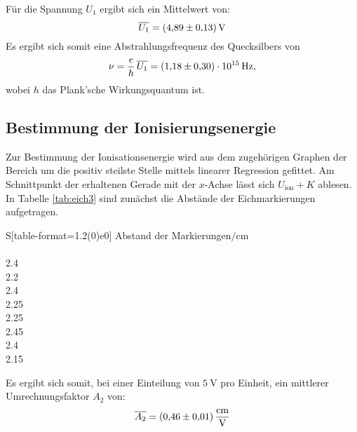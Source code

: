 \noindent Für die Spannung $U_1$ ergibt sich ein Mittelwert von:
\begin{equation}
	\overline{U_1} = \SI{4.89\pm0.13}{\volt}
\end{equation}
Es ergibt sich somit eine Abstrahlungsfrequenz des Quecksilbers von
\begin{equation}
	\nu = \frac{e}{h}\, \overline{U_1} = \SI{1.18\pm0.3e15}{\hertz},
\end{equation}
wobei $h$\cite{plank} das Plank'sche Wirkungsquantum ist.

\subsection{Bestimmung der Ionisierungsenergie}
Zur Bestimmung der Ionisationsenergie wird aus dem zugehörigen Graphen der Bereich um die positiv steilste Stelle mittels linearer Regression gefittet.
Am Schnittpunkt der erhaltenen Gerade mit der $x$-Achse lässt sich $U_\text{ion} + K$ ablesen.
In Tabelle \ref{tab:eich3} sind zunächst die Abstände der Eichmarkierungen aufgetragen.
\begin{table}[H]
    \caption{Abstände der Eichmarkierungen.}
    \label{tab:eich3}
    \centering
    \begin{tabular}{S[table-format=1.2(0)e0]}
        \toprule
{Abstand der Markierungen$/\si{\centi\meter}$} \\
		 \\
2.4 \\
2.2 \\
2.4 \\
2.25 \\
2.25 \\
2.45 \\
2.4 \\
2.15 \\
        \bottomrule
    \end{tabular}
\end{table}
\noindent
Es ergibt sich somit, bei einer Einteilung von $\SI{5}{\volt}$ pro Einheit, ein mittlerer Umrechnungsfaktor $A_2$ von:
\begin{equation}
	\overline{A_2} = \SI{0.46\pm0.01}{\centi\meter\per\volt}
\end{equation}

